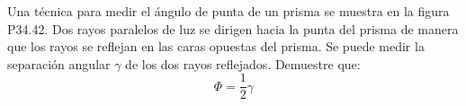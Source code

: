\item Una técnica para medir el ángulo de punta de un prisma se muestra en la figura P34.42. Dos rayos paralelos de luz se dirigen hacia la punta del prisma de manera que los rayos se reflejan en las caras opuestas del prisma. Se puede medir la separación angular $\gamma$ de los dos rayos reflejados. Demuestre que:
$$ \Phi = \frac{1}{2} \gamma $$